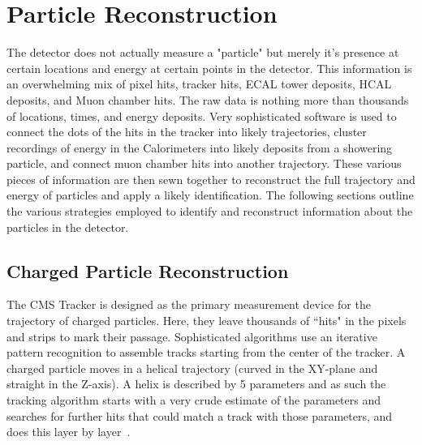 \chapter{Particle Reconstruction}
\label{ch:particle_reconstruction}
	The detector does not actually measure a "particle" but merely it's presence at certain locations and energy at certain points in the detector. This information is an overwhelming mix of pixel hits, tracker hits, ECAL tower deposits, HCAL deposits, and Muon chamber hits. The raw data is nothing more than thousands of locations, times, and energy deposits. Very sophisticated software is used to connect the dots of the hits in the tracker into likely trajectories, cluster recordings of energy in the Calorimeters into likely deposits from a showering particle, and connect muon chamber hits into another trajectory. These various pieces of information are then sewn together to reconstruct the full trajectory and energy of particles and apply a likely identification. The following sections outline the various strategies employed to identify and reconstruct information about the particles in the detector.\\	
	
	
	\section{Charged Particle Reconstruction}
	\label{sec:charged_particle_reconstruction}
	The CMS Tracker is designed as the primary measurement device for the trajectory of charged particles. Here, they leave thousands of ``hits" in the pixels and strips to mark their passage. Sophisticated algorithms use an iterative pattern recognition to assemble tracks starting from the center of the tracker. A charged particle moves in a helical trajectory (curved in the XY-plane and straight in the Z-axis). A helix is described by 5 parameters and as such the tracking algorithm starts with a very crude estimate of the parameters and searches for further hits that could match a track with those parameters, and does this layer by layer~\cite{pixel, mangano, trackingperformance}.\\
	
